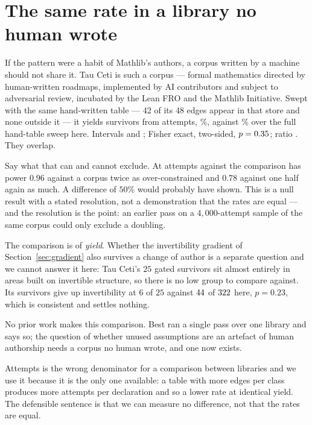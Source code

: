 \documentclass[11pt]{article}
\begin{document}
\section{The same rate in a library no human wrote}\label{sec:tauceti}

If the pattern were a habit of Mathlib's authors, a corpus written by a machine
should not share it. Tau Ceti \cite{tauceti} is such a corpus --- formal
mathematics directed by human-written roadmaps, implemented by AI contributors
and subject to adversarial review, incubated by the Lean FRO and the Mathlib
Initiative. Swept with the same hand-written table --- 42 of its 48 edges appear in that
store and none outside it --- it yields \tauSurvivors{} survivors from
\tauAttempts{} attempts, \tauYield{}\%, against \allYield{}\% over the full
hand-table sweep here. Intervals \tauYieldCI{} and \allYieldCI{}; Fisher exact,
two-sided, $p = 0.35{}$; ratio \tauRatio{}. They overlap.

Say what that can and cannot exclude. At \tauAttempts{} attempts against
\allAttempts{} the comparison has power $0.96$ against a corpus twice as
over-constrained and $0.78$ against one half again as much. A difference of
$50\%$ would probably have shown. This is a null result with a stated
resolution, not a demonstration that the rates are equal --- and the resolution
is the point: an earlier pass on a $4{,}000$-attempt sample of the same corpus
could only exclude a doubling.

The comparison is of \emph{yield}. Whether the invertibility gradient of
Section~\ref{sec:gradient} also survives a change of author is a separate
question and we cannot answer it here: Tau Ceti's \(25\) gated survivors sit
almost entirely in areas built on invertible structure, so there is no low group
to compare against. Its survivors give up invertibility at \(6\) of \(25\)
against \(44{}\) of \(322{}\) here, $p = 0.23$, which is
consistent and settles nothing.

No prior work makes this comparison. Best ran a single pass over one library and
says so; the question of whether unused assumptions are an artefact of human
authorship needs a corpus no human wrote, and one now exists.

Attempts is the wrong denominator for a comparison between libraries and we use
it because it is the only one available: a table with more edges per class
produces more attempts per declaration and so a lower rate at identical yield.
The defensible sentence is that we can measure no difference, not that the rates
are equal.
\end{document}
